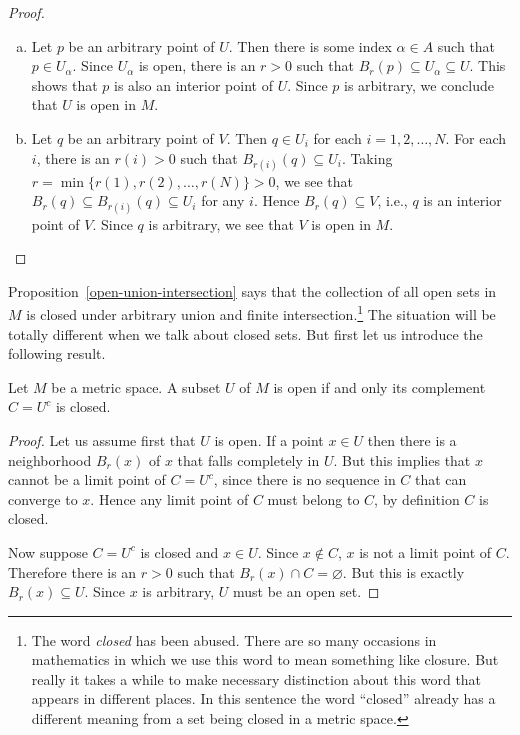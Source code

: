 \begin{proof}
  \begin{enumerate}[(a)]
    \item Let $p$ be an arbitrary point of $U$.  Then there is some index $\alpha \in A$ such that $p \in U_\alpha$.
      Since $U_\alpha$ is open, there is an $r > 0$ such that $B_r(p) \subseteq U_\alpha \subseteq U$.
      This shows that $p$ is also an interior point of $U$.
      Since $p$ is arbitrary, we conclude that $U$ is open in $M$.

    \item Let $q$ be an arbitrary point of $V$.  Then $q \in U_i$ for each $i = 1, 2, \dots, N$.
      For each $i$, there is an $r(i) > 0$ such that $B_{r(i)}(q) \subseteq U_i$.
      Taking $r = \min \{ r(1), r(2), \dots, r(N) \} > 0$, we see that $B_r(q) \subseteq B_{r(i)}(q) \subseteq U_i$ for any $i$.
      Hence $B_r(q) \subseteq V$, i.e., $q$ is an interior point of $V$.
      Since $q$ is arbitrary, we see that $V$ is open in $M$.
  \end{enumerate}
\end{proof}

Proposition~\ref{open-union-intersection} says that the collection of all open sets in $M$ is closed under arbitrary union and finite intersection.\footnote{The word {\em closed} has been abused.  There are so many occasions in mathematics in which we use this word to mean something like closure.  But really it takes a while to make necessary distinction about this word that appears in different places.  In this sentence the word ``closed'' already has a different meaning from a set being closed in a metric space.}
The situation will be totally different when we talk about closed sets.
But first let us introduce the following result.

\begin{thm}
  \label{thm:open-closed}
  Let $M$ be a metric space.
  A subset $U$ of $M$ is open if and only its complement $C = U^c$ is closed.
\end{thm}

\begin{proof}
  Let us assume first that $U$ is open.
  If a point $x \in U$ then there is a neighborhood $B_r(x)$ of $x$ that falls completely in $U$.  But this implies that $x$ cannot be a limit point of $C = U^c$, since there is no sequence in $C$ that can converge to $x$.  Hence any limit point of $C$ must belong to $C$, by definition $C$ is closed.

  Now suppose $C = U^c$ is closed and $x \in U$.
  Since $x \notin C$, $x$ is not a limit point of $C$.
  Therefore there is an $r > 0$ such that $B_r(x) \cap C = \varnothing$.
  But this is exactly $B_r(x) \subseteq U$.
  Since $x$ is arbitrary, $U$ must be an open set.
\end{proof}

